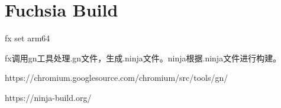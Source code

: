 \section{Fuchsia Build}

fx set arm64

fx调用gn工具处理.gn文件，生成.ninja文件。ninja根据.ninja文件进行构建。

https://chromium.googlesource.com/chromium/src/tools/gn/

https://ninja-build.org/